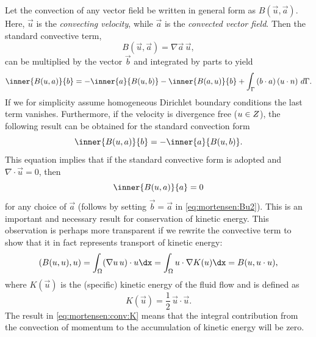 Let the convection of any vector field be written in general form as
$B(\vec{u},\vec{a})$. Here, $\vec{u}$ is the \emph{convecting velocity},
while $\vec{a}$ is the \emph{convected vector field}. Then the standard
convective term,
\begin{equation}
B(\vec{u},\vec{a}) =  \nabla \vec{a} \, \vec{u},
\end{equation}
can be multiplied by the vector $\vec{b}$ and integrated by parts to yield
\begin{equation}
 \inner{ B(\vec{u}, \vec{a})}{\vec{b}}
      = -\inner{\vec{a}}{B(\vec{u},\vec{b})}
        - \inner{B (\vec{a}, \vec{u})}{\vec{b} }
        + \int_{\Gamma} \left(\vec{b} \cdot \vec{a} \right)\left(\vec{u} \cdot \vec{n} \right) \, d\Gamma.
\label{eq:mortensen:Bu1}
\end{equation}
If we for simplicity assume homogeneous Dirichlet boundary conditions
the last term vanishes. Furthermore, if the velocity is divergence free
(${u}\in Z$), the following result can be obtained for the
standard convection form
\begin{equation}
  \inner{ B(\vec{u},\vec{a})}{\vec{b} } = -\inner{ \vec{a}}{ B(\vec{u},\vec{b}) }.
\label{eq:mortensen:Bu2}
\end{equation}
This equation implies that if the standard convective form is adopted
and $\nabla\cdot\vec{u} = 0$, then
\begin{equation}
\inner{ B(\vec{u}, \vec{a})}{ \vec{a} } = 0
\label{eq:mortensen:B0}
\end{equation}
for any choice of $\vec{a}$ (follows by setting $\vec{b}=\vec{a}$ in
\eqref{eq:mortensen:Bu2}). This is an important and necessary result
for conservation of kinetic energy. This observation is perhaps more
transparent if we rewrite the convective term to show that it in fact
represents transport of kinetic energy:
\begin{equation}
\label{eq:mortensen:conv:K}
\left(B(\vec{u}, \vec{u}), \vec{u} \right)
= \int_\Omega (\nabla\vec{u} \, \vec{u})\cdot\vec{u}\dx
= \int_\Omega \vec{u}\cdot\nabla K(\vec{u})\dx
= B(\vec{u}, \vec{u}\cdot\vec{u}),
\end{equation}
where $K(\vec{u})$ is the (specific) kinetic energy of the fluid flow
and is defined as
\begin{equation}
 K(\vec{u})=\frac{1}{2}\, \vec{u}\cdot \vec{u}. \label{eq:mortensen:K}
\end{equation}
The result in \eqref{eq:mortensen:conv:K} means that the integral
contribution from the convection of momentum to the accumulation of
kinetic energy will be zero.

